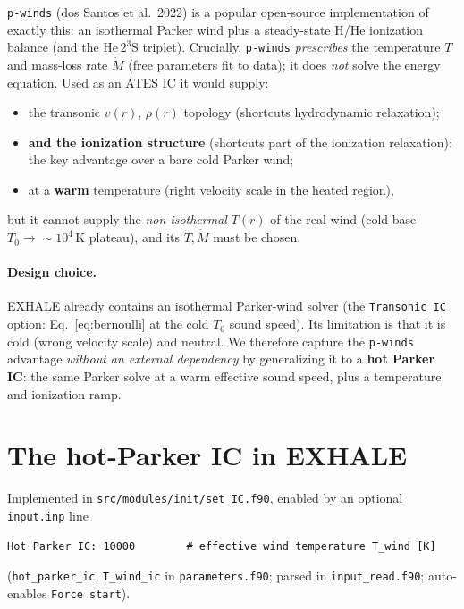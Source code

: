 \documentclass[english,a4paper]{my_memo}
\begin{document}
\texttt{p-winds} (dos Santos et al.\ 2022) is a popular open-source implementation
of exactly this: an isothermal Parker wind plus a steady-state H/He ionization
balance (and the He\,$2^3$S triplet). Crucially, \texttt{p-winds} \emph{prescribes}
the temperature $T$ and mass-loss rate $\dot M$ (free parameters fit to data); it
does \emph{not} solve the energy equation. Used as an ATES IC it would supply:
\begin{itemize}\itemsep1pt
\item the transonic $v(r)$, $\rho(r)$ topology (shortcuts hydrodynamic relaxation);
\item \textbf{and the ionization structure} (shortcuts part of the ionization
  relaxation): the key advantage over a bare cold Parker wind;
\item at a \textbf{warm} temperature (right velocity scale in the heated region),
\end{itemize}
but it cannot supply the \emph{non-isothermal} $T(r)$ of the real wind (cold base
$T_0\to\sim10^4$\,K plateau), and its $T,\dot M$ must be chosen.

\paragraph{Design choice.} EXHALE already contains an isothermal Parker-wind solver
(the \texttt{Transonic IC} option: Eq.~\ref{eq:bernoulli} at the cold $T_0$ sound
speed). Its limitation is that it is cold (wrong velocity scale) and neutral. We
therefore capture the \texttt{p-winds} advantage \emph{without an external
dependency} by generalizing it to a \textbf{hot Parker IC}: the same Parker solve at
a warm effective sound speed, plus a temperature and ionization ramp.

\section{The hot-Parker IC in EXHALE}
Implemented in \texttt{src/modules/init/set\_IC.f90}, enabled by an optional
\texttt{input.inp} line
\begin{lstlisting}
Hot Parker IC: 10000        # effective wind temperature T_wind [K]
\end{lstlisting}
(\texttt{hot\_parker\_ic}, \texttt{T\_wind\_ic} in \texttt{parameters.f90}; parsed
in \texttt{input\_read.f90}; auto-enables \texttt{Force start}).
\end{document}
